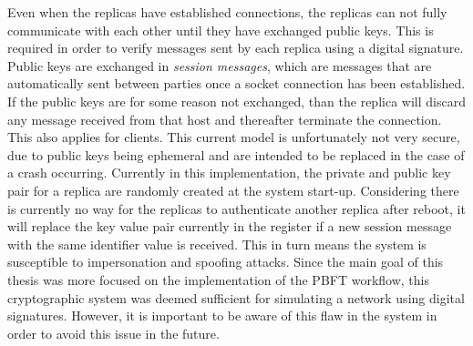 Even when the replicas have established connections, the replicas can not fully communicate with each other until they have exchanged public keys. This is required in order to verify messages sent by each replica using a digital signature. Public keys are exchanged in \emph{session messages}, which are messages that are automatically sent between parties once a socket connection has been established. If the public keys are for some reason not exchanged, than the replica will discard any message received from that host and thereafter terminate the connection. This also applies for clients. This current model is unfortunately not very secure, due to public keys being ephemeral and are intended to be replaced in the case of a crash occurring. Currently in this implementation, the private and public key pair for a replica are randomly created at the system start-up. Considering there is currently no way for the replicas to authenticate another replica after reboot, it will replace the key value pair currently in the register if a new session message with the same identifier value is received. This in turn means the system is susceptible to impersonation and spoofing attacks. Since the main goal of this thesis was more focused on the implementation of the PBFT workflow, this cryptographic system was deemed sufficient for simulating a network using digital signatures. However, it is important to be aware of this flaw in the system in order to avoid this issue in the future. %

